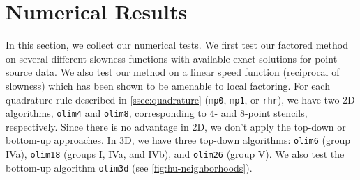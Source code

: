\documentclass[sisc-eikonal.tex]{subfiles}
\begin{document}
\section{Numerical Results}\label{sec:numerical-results} In this
section, we collect our numerical tests. We first test our factored
method on several different slowness functions with available exact
solutions for point source data. We also test our method on a linear
speed function (reciprocal of slowness) which has been shown to be
amenable to local factoring. For each quadrature rule described in
\cref{ssec:quadrature} (\texttt{mp0}, \texttt{mp1}, or \texttt{rhr}),
we have two 2D algorithms, \texttt{olim4} and \texttt{olim8},
corresponding to 4- and 8-point stencils, respectively. Since there is
no advantage in 2D, we don't apply the top-down or bottom-up
approaches. In 3D, we have three top-down algorithms: \texttt{olim6}
(group IVa), \texttt{olim18} (groups I, IVa, and IVb), and
\texttt{olim26} (group V). We also test the bottom-up algorithm
\texttt{olim3d} (see \cref{fig:hu-neighborhoods}).
\end{document}
